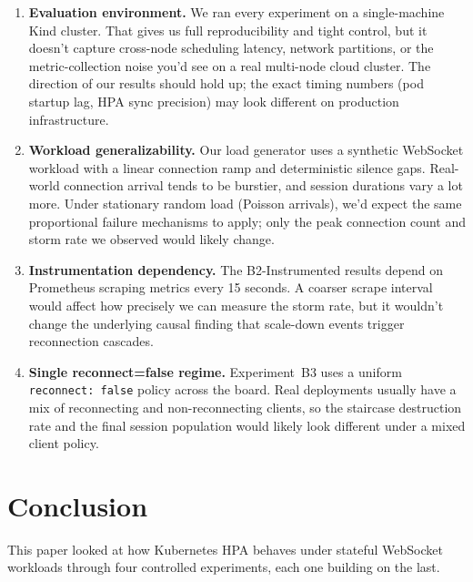 \documentclass[pdflatex,sn-mathphys-num]{sn-jnl}
\theoremstyle{thmstyleone}%
\theoremstyle{thmstyletwo}%
\theoremstyle{thmstylethree}%
\begin{document}
\begin{enumerate}[leftmargin=*]

\item \textbf{Evaluation environment.} We ran every experiment on a single-machine
Kind cluster. That gives us full reproducibility and tight control, but it doesn't
capture cross-node scheduling latency, network partitions, or the metric-collection
noise you'd see on a real multi-node cloud cluster. The direction of our results
should hold up; the exact timing numbers (pod startup lag, HPA sync precision) may
look different on production infrastructure.

\item \textbf{Workload generalizability.} Our load generator uses a synthetic
WebSocket workload with a linear connection ramp and deterministic silence gaps.
Real-world connection arrival tends to be burstier, and session durations vary a
lot more. Under stationary random load (Poisson arrivals), we'd expect the same
proportional failure mechanisms to apply; only the peak connection count and storm
rate we observed would likely change.

\item \textbf{Instrumentation dependency.} The B2-Instrumented results depend on
Prometheus scraping metrics every 15 seconds. A coarser scrape interval would
affect how precisely we can measure the storm rate, but it wouldn't change the
underlying causal finding that scale-down events trigger reconnection cascades.

\item \textbf{Single reconnect=false regime.} Experiment~B3 uses a uniform
\texttt{reconnect: false} policy across the board. Real deployments usually have a
mix of reconnecting and non-reconnecting clients, so the staircase destruction rate
and the final session population would likely look different under a mixed
client policy.

\end{enumerate}



\section{Conclusion}
\label{sec:conclusion}

This paper looked at how Kubernetes HPA behaves under stateful WebSocket workloads
through four controlled experiments, each one building on the last.
\end{document}
